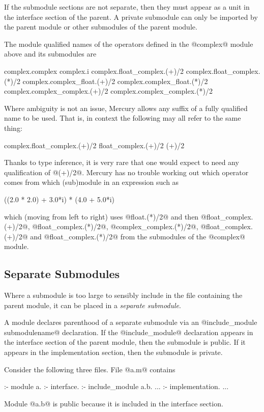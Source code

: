 If the submodule sections are not separate, then they must appear as a
unit in the interface section of the parent.  A private submodule can
only be imported by the parent module or other submodules of the parent
module.

The module qualified names of the operators defined in the @complex@
module above and its submodules are
\begin{myverbatim}
    complex.complex
    complex.i
    complex.float_complex.(+)/2
    complex.float_complex.(*)/2
    complex.complex_float.(+)/2
    complex.complex_float.(*)/2
    complex.complex_complex.(+)/2
    complex.complex_complex.(*)/2
\end{myverbatim}
Where ambiguity is not an issue, Mercury allows any suffix of
a fully qualified name to be used.  That is, in context the following
may all refer to the same thing:
\begin{myverbatim}
    complex.float_complex.(+)/2
    float_complex.(+)/2
    (+)/2
\end{myverbatim}
Thanks to type inference, it is very rare that one would expect to need
any qualification of @(+)/2@.
Mercury has no trouble
working out which operator comes from which (sub)module in an expression
such as
\begin{myverbatim}
    ((2.0 * 2.0) + 3.0*i) * (4.0 + 5.0*i)
\end{myverbatim}
which (moving from left to right) uses @float.(*)/2@ and then
@float_complex.(+)/2@, @float_complex.(*)/2@,
@complex_complex.(*)/2@, @float_complex.(+)/2@ and
@float_complex.(*)/2@ from the submodules of the @complex@ module.

\subsection{Separate Submodules}

Where a submodule is too large to sensibly include in the file
containing the parent module, it can be placed in a \emph{separate
submodule}.

A module declares parenthood of a separate submodule via an
@include_module submodulename@ declaration.  If the @include_module@
declaration appears in the interface section of the parent module, then
the submodule is public.  If it appears in the implementation section,
then the submodule is private.

Consider the following three files.  File @a.m@ contains
\begin{myverbatim}
:- module a.
:- interface.
:- include_module a.b.
...
:- implementation.
...
\end{myverbatim}
Module @a.b@ is public because it is included in the interface section.



